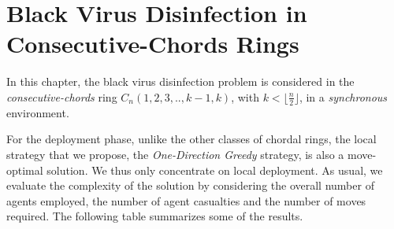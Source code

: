 


\chapter {Black Virus Disinfection in Consecutive-Chords Rings}
\label{CL}
 


In this chapter, the black virus disinfection problem is considered in the {\it consecutive-chords}  ring $C_n(1,2,3,..,k-1,k)$, with  $k < \lfloor\frac{n}{2}\rfloor$,  in a {\it synchronous} environment. 





For the deployment phase, unlike the other classes of chordal rings, the local strategy that we propose, the {\it One-Direction Greedy} strategy,  is also a move-optimal solution. We thus only concentrate on local deployment.
As usual, we evaluate the complexity of the solution
 by considering the  overall number of agents employed, the number of agent casualties and the number of moves required.   The following table summarizes some of the results. 

 

\begin{center}
 \end{center}






